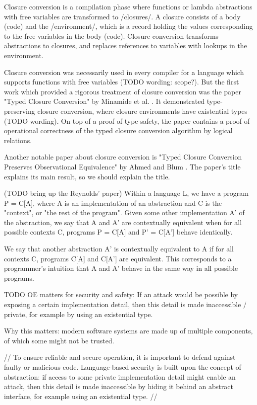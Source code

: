 \documentclass[bsc,frontabs,oneside,singlespacing,parskip,deptreport]{infthesis}
\theoremstyle{definition}
\begin{document}
Closure conversion is a compilation phase where functions or lambda
abstractions with free variables are transformed to /closures/. A
closure consists of a body (code) and the /environment/, which is a
record holding the values corresponding to the free variables in the
body (code). Closure conversion transforms abstractions to closures,
and replaces references to variables with lookups in the environment.

Closure conversion was necessarily used in every compiler for a
language which supports functions with free variables (TODO wording:
scope?). But the first work which provided a rigorous treatment of
closure conversion was the paper "Typed Closure Conversion" by
Minamide et al. \cite{TODO}. It demonstrated type-preserving closure
conversion, where closure environments have existential types (TODO
wording). On top of a proof of type-safety, the paper contains a proof
of operational correctness of the typed closure conversion algorithm
by logical relations.

Another notable paper about closure conversion is "Typed Closure
Conversion Preserves Observational Equivalence" by Ahmed and Blum
\cite{TODO}. The paper's title explains its main result, so we should
explain the title.

(TODO bring up the Reynolds' paper) Within a language L, we have a
program P = C[A], where A is an implementation of an abstraction and C
is the "context", or "the rest of the program". Given some other
implementation A' of the abstraction, we say that A and A' are
contextually equivalent when for all possible contexts C, programs P =
C[A] and P' = C[A'] behave identically.

We say that another abstraction A' is contextually equivalent to A if
for all contexts C, programs C[A] and C[A'] are equivalent. This
corresponds to a programmer's intuition that A and A' behave in the
same way in all possible programs.

TODO OE matters for security and safety: If an attack would be
possible by exposing a certain implementation detail, then this detail
is made inaccessible / private, for example by using an existential
type.

Why this matters: modern software systems are made up of multiple
components, of which some might not be trusted.

// To ensure reliable and secure operation, it is important to defend
against faulty or malicious code. Language-based security is built
upon the concept of abstraction: if access to some private
implementation detail might enable an attack, then this detail is made
inaccessible by hiding it behind an abstract interface, for example
using an existential type. //
\end{document}
